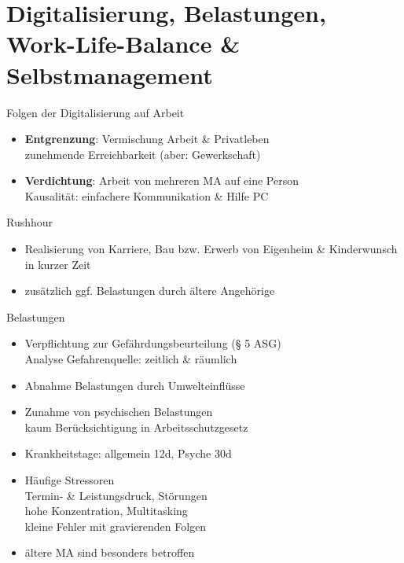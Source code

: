 \documentclass{cheatsheet}
\begin{document}
    \section{Digitalisierung, Belastungen, Work-Life-Balance \& Selbstmanagement}
    \begin{sectionbox}{Folgen der Digitalisierung auf Arbeit}
        \begin{itemize}
            \item \textbf{Entgrenzung}: Vermischung Arbeit \& Privatleben\\
            \ra zunehmende Erreichbarkeit (aber: Gewerkschaft)
            \item \textbf{Verdichtung}: Arbeit von mehreren MA auf eine Person\\
            \ra Kausalität: einfachere Kommunikation \& Hilfe PC
        \end{itemize}
    \end{sectionbox}
    \begin{warningbox}{Rushhour}
        \begin{itemize}
            \item Realisierung von Karriere, Bau bzw. Erwerb von Eigenheim \& Kinderwunsch in kurzer Zeit
            \item zusätzlich ggf. Belastungen durch ältere Angehörige
        \end{itemize}
    \end{warningbox}
    \begin{sectionbox}{Belastungen}
        \begin{itemize}
            \item Verpflichtung zur Gefährdungsbeurteilung (§ 5 ASG)\\
            \ra Analyse Gefahrenquelle: zeitlich \& räumlich 
            \item Abnahme Belastungen durch Umwelteinflüsse
            \item Zunahme von psychischen Belastungen\\
            \ra kaum Berücksichtigung in Arbeitsschutzgesetz
            \item Krankheitstage: allgemein 12d, Psyche 30d 
            \item Häufige Stressoren\\
            \ra Termin- \& Leistungsdruck, Störungen\\
            \ra hohe Konzentration, Multitasking\\
            \ra kleine Fehler mit gravierenden Folgen
            \item ältere MA sind besonders betroffen
        \end{itemize}
    \end{sectionbox}
\end{document}

